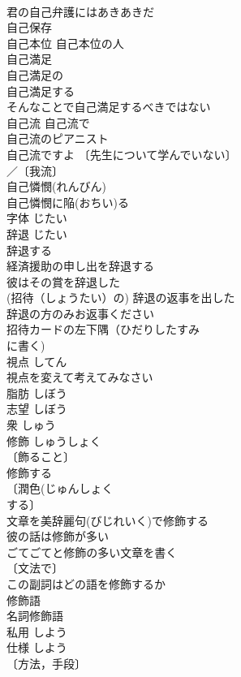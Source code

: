 \documentclass[8pt]{extreport}
\begin{document}
\begin{CJK}{UTF8}{min}
\\	君の自己弁護にはあきあきだ 
\\	自己保存 
\\	自己本位 自己本位の人 
\\	自己満足 
\\	自己満足の 
\\	自己満足する 
\\	そんなことで自己満足するべきではない 
\\	自己流 自己流で 
\\	自己流のピアニスト 
\\	自己流ですよ 〔先生について学んでいない〕
\\	／〔我流〕
\\	自己憐憫(れんびん) 
\\	自己憐憫に陥(おちい)る 
\\	字体	じたい	
\\	辞退	じたい	
\\	辞退する 
\\	経済援助の申し出を辞退する 
\\	彼はその賞を辞退した 
\\	(招待（しょうたい）の) 辞退の返事を出した 
\\	辞退の方のみお返事ください 
\\	招待カードの左下隅（ひだりしたすみ　
\\	に書く)
\\	視点	してん	
\\	視点を変えて考えてみなさい 
\\	脂肪	しぼう	
\\	志望	しぼう	
\\	衆	しゅう	
\\	修飾	しゅうしょく	
\\	〔飾ること〕
\\	修飾する 
\\	〔潤色(じゅんしょく　
\\	する〕
\\	文章を美辞麗句(びじれいく)で修飾する 
\\	彼の話は修飾が多い 
\\	ごてごてと修飾の多い文章を書く 
\\	〔文法で〕
\\	この副詞はどの語を修飾するか 
\\	修飾語 
\\	名詞修飾語 
\\	私用	しよう	
\\	仕様	しよう	
\\	〔方法，手段〕

\end{CJK}
\end{document}
